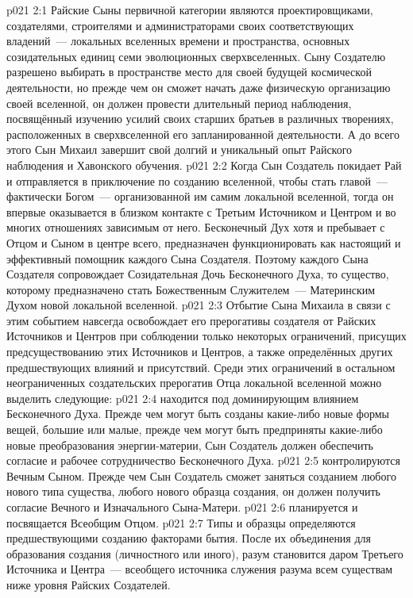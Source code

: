 \vs p021 2:1 Райские Сыны первичной категории являются проектировщиками, создателями, строителями и администраторами своих соответствующих владений~--- локальных вселенных времени и пространства, основных созидательных единиц семи эволюционных сверхвселенных. Сыну Создателю разрешено выбирать в пространстве место для своей будущей космической деятельности, но прежде чем он сможет начать даже физическую организацию своей вселенной, он должен провести длительный период наблюдения, посвящённый изучению усилий своих старших братьев в различных творениях, расположенных в сверхвселенной его запланированной деятельности. А до всего этого Сын Михаил завершит свой долгий и уникальный опыт Райского наблюдения и Хавонского обучения.
\vs p021 2:2 \pc Когда Сын Создатель покидает Рай и отправляется в приключение по созданию вселенной, чтобы стать главой~--- фактически Богом~--- организованной им самим локальной вселенной, тогда он впервые оказывается в близком контакте с Третьим Источником и Центром и во многих отношениях зависимым от него. Бесконечный Дух хотя и пребывает с Отцом и Сыном в центре всего, предназначен функционировать как настоящий и эффективный помощник каждого Сына Создателя. Поэтому каждого Сына Создателя сопровождает Созидательная Дочь Бесконечного Духа, то существо, которому предназначено стать Божественным Служителем~--- Материнским Духом новой локальной вселенной.
\vs p021 2:3 Отбытие Сына Михаила в связи с этим событием навсегда освобождает его прерогативы создателя от Райских Источников и Центров при соблюдении только некоторых ограничений, присущих предсуществованию этих Источников и Центров, а также определённых других предшествующих влияний и присутствий. Среди этих ограничений в остальном неограниченных создательских прерогатив Отца локальной вселенной можно выделить следующие:
\vs p021 2:4  находится под доминирующим влиянием Бесконечного Духа. Прежде чем могут быть созданы какие\hyp{}либо новые формы вещей, большие или малые, прежде чем могут быть предприняты какие\hyp{}либо новые преобразования энергии\hyp{}материи, Сын Создатель должен обеспечить согласие и рабочее сотрудничество Бесконечного Духа.
\vs p021 2:5  контролируются Вечным Сыном. Прежде чем Сын Создатель сможет заняться созданием любого нового типа существа, любого нового образца создания, он должен получить согласие Вечного и Изначального Сына\hyp{}Матери.
\vs p021 2:6  планируется и посвящается Всеобщим Отцом.
\vs p021 2:7 \pc Типы и образцы  определяются предшествующими созданию факторами бытия. После их объединения для образования создания (личностного или иного), разум становится даром Третьего Источника и Центра~--- всеобщего источника служения разума всем существам ниже уровня Райских Создателей.
